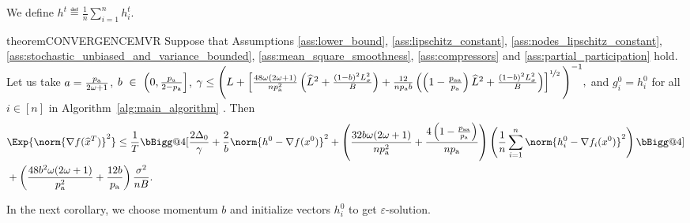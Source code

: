 \documentclass{article}
\makeatletter
\newcommand{\algorithmname}{DASHA-PP}
\newcommand*{\probavailable}{\ensuremath{p_{\textnormal{a}}}}
\newcommand*{\probpairaa}{\ensuremath{p_{\textnormal{aa}}}}
\newcommand{\vast}{\bBigg@{4}}
\makeatother
\begin{document}
We define $h^t \eqdef \frac{1}{n}\sum_{i=1}^n h^t_i$.

\begin{restatable}{theorem}{CONVERGENCEMVR}
  \label{theorem:stochastic}
  Suppose that Assumptions \ref{ass:lower_bound}, \ref{ass:lipschitz_constant}, \ref{ass:nodes_lipschitz_constant}, \ref{ass:stochastic_unbiased_and_variance_bounded}, \ref{ass:mean_square_smoothness}, \ref{ass:compressors} and \ref{ass:partial_participation} hold. Let us take $a = \frac{\probavailable}{2\omega + 1}$, $b~\in~\left(0, \frac{\probavailable}{2 - \probavailable}\right]$, 
  {\scriptsize $\gamma \leq \Bigg(L + \left[\frac{48 \omega (2 \omega + 1)}{n \probavailable^2} \left(\widehat{L}^2 + \frac{(1 - b)^2 L_{\sigma}^2}{B}\right) + \frac{12}{n \probavailable b}\left(\left(1 - \frac{\probpairaa}{\probavailable}\right) \widehat{L}^2 + \frac{(1 - b)^2 L_{\sigma}^2}{B}\right)\right]^{\nicefrac{1}{2}}\Bigg)^{-1},$}
  and $g^{0}_i = h^{0}_i$ for all $i \in [n]$
  in Algorithm~\ref{alg:main_algorithm} \algname{(\algorithmname-MVR)}.
  Then 
{\scriptsize\begin{align*}
  &\Exp{\norm{\nabla f(\widehat{x}^T)}^2} \leq \frac{1}{T}\vast[\frac{2 \Delta_0}{\gamma} + \frac{2}{b} \norm{h^{0} - \nabla f(x^{0})}^2 + \left(\frac{32 b \omega (2 \omega + 1)}{n \probavailable^2} + \frac{4 \left(1 - \frac{\probpairaa}{\probavailable}\right)}{n \probavailable}\right)\left(\frac{1}{n}\sum_{i=1}^n\norm{h^{0}_i - \nabla f_i(x^{0})}^2\right)\vast] \\
  &+ \left(\frac{48 b^2 \omega (2 \omega + 1)}{\probavailable^2} + \frac{12 b}{\probavailable}\right) \frac{\sigma^2}{n B}.
\end{align*}}
\end{restatable}

In the next corollary, we choose momentum $b$ and initialize vectors $h^{0}_i$ to get $\varepsilon$-solution. 
\end{document}
